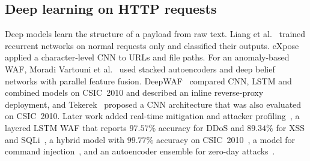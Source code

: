 \documentclass[preprint,11pt]{elsarticle}
\begin{document}
\subsection{Deep learning on HTTP requests}
Deep models learn the structure of a payload from raw text. Liang et
al.~\cite{liang2017rnn} trained recurrent networks on normal requests only
and classified their outputs. eXpose~\cite{saxe2017expose} applied a
character-level CNN to URLs and file paths. For an anomaly-based WAF,
Moradi Vartouni et al.~\cite{vartouni2019deepwaf} used stacked autoencoders
and deep belief networks with parallel feature fusion.
DeepWAF~\cite{kuang2019deepwaf} compared CNN, LSTM and combined models on
CSIC~2010 and described an inline reverse-proxy deployment, and
Tekerek~\cite{tekerek2021cnn} proposed a CNN architecture that was also
evaluated on CSIC~2010. Later work added real-time mitigation and attacker
profiling~\cite{shahid2022framework}, a layered LSTM WAF that reports
$97.57\%$ accuracy for DDoS and $89.34\%$ for XSS and
SQLi~\cite{dawadi2023lstmwaf}, a hybrid model with $99.77\%$ accuracy on
CSIC~2010~\cite{scireports2024novelxsssqli}, a model for command
injection~\cite{scireports2024cmdi}, and an autoencoder ensemble for
zero-day attacks~\cite{zeroday2025ensemble}.
\end{document}
